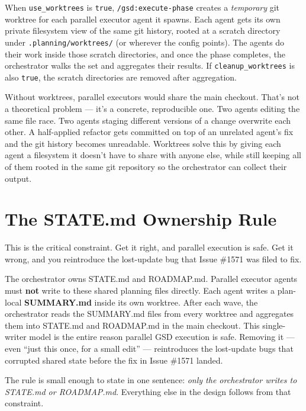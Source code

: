 \documentclass[11pt,letterpaper,openany]{book}
\begin{document}
\noindent
When \texttt{use\_worktrees} is \texttt{true},
\texttt{/gsd:execute-phase} creates a \emph{temporary} git worktree
for each parallel executor agent it spawns. Each agent gets its
own private filesystem view of the same git history, rooted at
a scratch directory under \texttt{.planning/worktrees/} (or wherever
the config points). The agents do their work inside those scratch
directories, and once the phase completes, the orchestrator walks
the set and aggregates their results. If \texttt{cleanup\_worktrees}
is also \texttt{true}, the scratch directories are removed after
aggregation.

Without worktrees, parallel executors would share the main checkout.
That's not a theoretical problem --- it's a concrete, reproducible
one. Two agents editing the same file race. Two agents staging
different versions of a change overwrite each other. A half-applied
refactor gets committed on top of an unrelated agent's fix and the
git history becomes unreadable. Worktrees solve this by giving each
agent a filesystem it doesn't have to share with anyone else, while
still keeping all of them rooted in the same git repository so the
orchestrator can collect their output.

\section{The STATE.md Ownership Rule}

This is the critical constraint. Get it right, and parallel execution
is safe. Get it wrong, and you reintroduce the lost-update bug that
Issue \#1571 was filed to fix.

\begin{gsdimportant}
The orchestrator owns STATE.md and ROADMAP.md. Parallel executor
agents must \textbf{not} write to these shared planning files
directly. Each agent writes a plan-local \textbf{SUMMARY.md} inside
its own worktree. After each wave, the orchestrator reads the
SUMMARY.md files from every worktree and aggregates them into
STATE.md and ROADMAP.md in the main checkout. This single-writer
model is the entire reason parallel GSD execution is safe. Removing
it --- even ``just this once, for a small edit'' --- reintroduces
the lost-update bugs that corrupted shared state before the fix
in Issue \#1571 landed.
\end{gsdimportant}

The rule is small enough to state in one sentence: \emph{only the
orchestrator writes to STATE.md or ROADMAP.md}. Everything else in
the design follows from that constraint.
\end{document}
